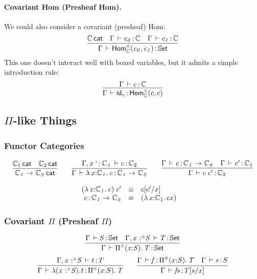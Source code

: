 \documentclass[11pt]{article}
\theoremstyle{plain}
\begin{document}
\paragraph{Covariant Hom (Presheaf Hom).}
We could also consider a covariant (presheaf) Hom:
\[
	\infer{
		\ofdtp{\Gamma}{\Hombind{\C}{\coc}{c_0}{c_1}}{\types}
	}{
		\wfdtp{\C} &
		\oftp{\Gamma}{c_0}{\C} & 
		\oftp{\Gamma}{c_1}{\C} 
	}
\]
This one doesn't interact well with boxed variables, but it admits a simple introduction rule:
\[
	\infer{
		\oftp{\Gamma}{\idm c}{\Hombind{\C}{\coc}{c}{c}}
	}{
		\oftp{\Gamma}{c}{\C}
	}
\]

\subsection{$\Pi$-like Things}

\subsubsection{Functor Categories}

\[
\begin{array}{c}
\infer{\wfdtp{\arr{\C_1}{\C_2}}}
      {\wfdtp{\C_1} &
        \wfdtp{\C_2}}
\qquad
\infer{\ofdtp{\Gamma}{\lam{x}{\C_1}{c}}{\arr {\C_1} {\C_2}}}
      {\ofdtp{\Gamma,\vptptm{x}{\co}{\C_1}}{c}{\C_2}}
\qquad
\infer{\ofdtp{\Gamma}{\app c {c'}}{\C_2}}
      {\ofdtp{\Gamma}{c}{\arr{\C_1}{\C_2}} &
        \ofdtp{\Gamma}{c'}{\C_1}}
\end{array}
\]

\[
\begin{array}{rcll}
\mathit{({\lambda\,x \mathit{:} \mathbb{C}_1.\,c}) \: c'} & \equiv & c [ c' / x ] \\
c \, \mathit{:} \, \mathit{\mathbb{C}_1}\rightarrow_{\mathit{}} \mathit{\mathbb{C}_2} & \equiv & {({\lambda\,x \mathit{:} \mathbb{C}_1.\,c}{x})} &
\end{array} \\
\]

\subsubsection{Covariant $\Pi$ (Presheaf $\Pi$)}
\begin{equation}
	\infer{
		\oftp{\Gamma}{\pico{x}{S}{T}}{\types}
	}{
		\oftp{\Gamma}{S}{\types} &
		\oftp{\Gamma, \tpvar x \coc S}{T}{\types}
	}
\end{equation}
\begin{equation}
	\infer{
		\oftp{\Gamma}{\laco x S t}{\pico{x}{S}{T}}
	}{
		\oftp{\Gamma, \tpvar x \coc S}{t}{T}
	}
	\qquad
	\infer{
		\oftp{\Gamma}{f s}{T[s/x]}
	}{
		\oftp{\Gamma}{f}{\pico{x}{S}{T}} &
		\oftp{\Gamma}{s}{S}
	}
\end{equation}
\end{document}
